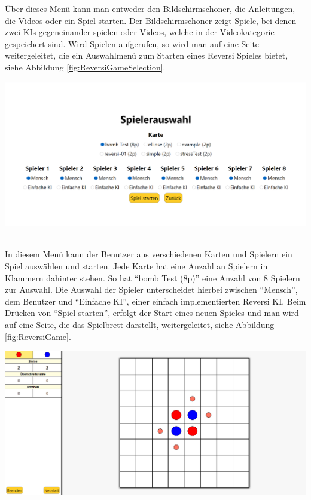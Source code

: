 \documentclass[12pt,a4paper,bibliography=totocnumbered,listof=totocnumbered]{article}
\begin{document}
Über dieses Menü kann man entweder den Bildschirmschoner, die Anleitungen, die Videos oder ein Spiel starten. Der Bildschirmschoner 
zeigt Spiele, bei denen zwei \ac{KI}s gegeneinander spielen oder Videos, welche in der Videokategorie gespeichert sind. Wird Spielen aufgerufen, 
so wird man auf eine Seite weitergeleitet, die ein Auswahlmenü zum Starten eines Reversi Spieles bietet, siehe Abbildung \ref{fig:ReversiGameSelection}.

\vspace{1em}
\begin{minipage}{\linewidth}
	\centering
	\includegraphics[width=0.7\linewidth]{pics/ReversiGameSelection.png}
	\label{fig:ReversiGameSelection}
\end{minipage}
\\

In diesem Menü kann der Benutzer aus verschiedenen Karten und Spielern ein Spiel auswählen und starten. Jede Karte hat eine Anzahl an Spielern 
in Klammern dahinter stehen. So hat ``bomb Test (8p)'' eine Anzahl von 8 Spielern zur Auswahl. Die Auswahl der Spieler unterscheidet hierbei
zwischen ``Mensch'', dem Benutzer und ``Einfache \ac{KI}'', einer einfach implementierten Reversi \ac{KI}. Beim Drücken von ``Spiel starten'', erfolgt der Start
eines neuen Spieles und man wird auf eine Seite, die das Spielbrett darstellt, weitergeleitet, siehe Abbildung \ref{fig:ReversiGame}.

\vspace{1em}
\begin{minipage}{\linewidth}
	\centering
	\includegraphics[width=0.7\linewidth]{pics/ReversiGame.png}
	\label{fig:ReversiGame}
\end{minipage}
\\
\end{document}

